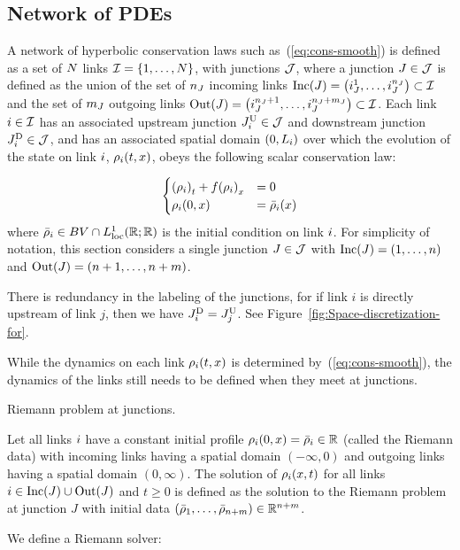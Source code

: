\subsection{Network of PDEs\label{sub:Network-of-PDE's}}

A network of hyperbolic conservation laws such as~(\ref{eq:cons-smooth})
is defined as a set of $N$ links $\links=\intrange 1{\nlinks}$,
with junctions $\mathcal{J}$, where a junction $J\in\mathcal{J}$ is defined
as the union of the set of $n_{J}$ incoming links $\Inc\left(\jn\right)=\tuple{\jlink{\jn}1}{\jlink{\jn}{\ninc_{\jn}}}\subset\links$
and the set of $m_{J}$ outgoing links $\Out\left(\jn\right)=\tuple{\jlink{\jn}{\ninc_{\jn}+1}}{\jlink{\jn}{\ninc_{\jn}+\nout_{\jn}}}\subset\links$.
Each link $i\in\mathcal{I}$ has an associated upstream junction $J_{i}^{\text{U}}\in\mathcal{J}$
and downstream junction $J_{i}^{\text{D}}\in\mathcal{J}$, and has an associated
spatial domain $\left(0,L_{\link}\right)$ over which the evolution
of the state on link $i$, $\cvar_{\link}\left(t,x\right)$, obeys
the following scalar conservation law:

\begin{equation}
\begin{cases}
\left(\cvar_{\link}\right)_{t}+f\left(\cvar_{\link}\right)_{x} & =0\\
\cvar_{\link}\left(0,x\right) & =\initstate_{\link}\left(x\right)
\end{cases}\label{eq:cauchy-i}
\end{equation}
where $\initstate_{\link}\in BV\cap L_{\text{loc}}^{1}\left(\mathbb{R};\mathbb{R}\right)$
is the initial condition on link $i$. For simplicity of notation,
this section considers a single junction $J\in\mathcal{J}$ with $\Inc\left(\jn\right)=\left(1,\ldots,\ninc\right)$
and $\Out\left(\jn\right)=\left(\ninc+1,\ldots,\ninc+\nout\right)$.
\begin{rem}
There is redundancy in the labeling of the junctions, for if link
$i$ is directly upstream of link $j$, then we have $J_{i}^{\text{D}}=J_{j}^{\text{U}}$.
See Figure~\ref{fig:Space-discretization-for}.
\end{rem}
While the dynamics on each link $\cvar_{\link}\left(t,x\right)$ is
determined by~(\ref{eq:cons-smooth}), the dynamics of the links
still needs to be defined when they meet at junctions.
\begin{defn}
Riemann problem at junctions. 

Let all links $i$ have a constant initial profile $\cvar_{\link}\left(0,x\right)=\initstate_{\link}\in\mathbb{R}$
(called the Riemann data) with incoming links having a spatial domain
$\left(-\infty,0\right)$ and outgoing links having a spatial domain
$\left(0,\infty\right)$. The solution of $\cvar_{\link}\left(x,t\right)$
for all links $\link\in\Inc\left(\jn\right)\cup\Out\left(\jn\right)$
and $t\ge0$ is defined as the solution to the Riemann problem at
junction $J$ with initial data $\tuple{\initstate_{1}}{\initstate_{\ninc+\nout}}\in\mathbb{R}^{\ninc+\nout}$.
\end{defn}
We define a Riemann solver:

